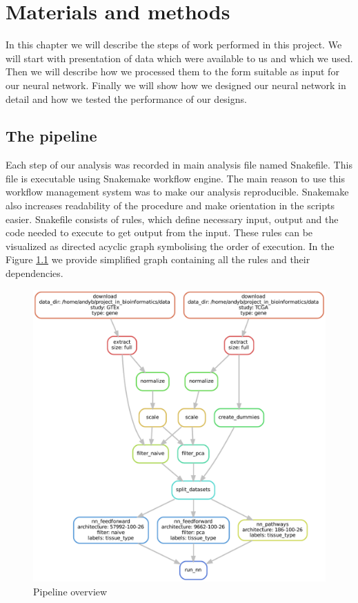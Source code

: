 \chapter{Materials and methods}
In this chapter we will describe the steps of work performed in this project.
We will start with presentation of data which were available to us and which we used.
Then we will describe how we processed them to the form suitable as input for our neural network.
Finally we will show how we designed our neural network in detail and how we tested the performance of our designs.

\section{The pipeline}
Each step of our analysis was recorded in main analysis file named Snakefile.
This file is executable using Snakemake workflow engine.
The main reason to use this workflow management system was to make our analysis reproducible.
Snakemake also increases readability of the procedure and make orientation in the scripts easier.
Snakefile consists of rules, which define necessary input, output and the code needed to execute to get output from the input.
These rules can be visualized as directed acyclic graph symbolising the order of execution.
In the Figure \ref{fig:dag} we provide simplified graph containing all the rules and their dependencies.

\begin{figure}
    \centering
    \includegraphics[width=\linewidth]{images/dag.pdf}
    \caption{Pipeline overview}
    \label{fig:dag}
\end{figure}

